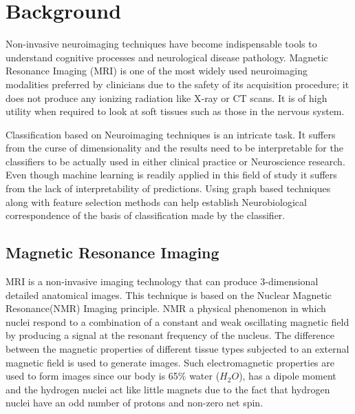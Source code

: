 \documentclass[msthesis.tex]{subfiles}
\begin{document}
\chapter{Background}
Non-invasive neuroimaging techniques have become indispensable tools to understand cognitive processes and neurological disease pathology. Magnetic Resonance Imaging (MRI)  is one of the most widely used neuroimaging modalities preferred by clinicians due to the safety of its acquisition procedure; it does not produce any ionizing radiation like X-ray or CT scans. It is of high utility when required to look at soft tissues such as those in the nervous system. 

Classification based on Neuroimaging techniques is an intricate task. It suffers from the curse of dimensionality and the results need to be interpretable for the classifiers to be actually used in either clinical practice or Neuroscience research. Even though machine learning is readily applied in this field of study it suffers from the lack of interpretability of predictions. Using graph based techniques along with feature selection methods can help establish Neurobiological correspondence of the basis of classification made by the classifier.  

\section{Magnetic Resonance Imaging}
MRI is a non-invasive imaging technology that can produce 3-dimensional detailed anatomical images\citep{mcrobbie_moore_graves_prince_2006}. This technique is based on the Nuclear Magnetic Resonance(NMR) Imaging principle. NMR a physical phenomenon in which nuclei respond to a combination of a constant and weak oscillating magnetic field by producing a signal at the resonant frequency of the nucleus. The difference between the magnetic properties of different tissue types subjected to an external magnetic field is used to generate images. Such electromagnetic properties are used to form images since our body is 65\% water ($H_2O$), has a dipole moment and the hydrogen nuclei act like little magnets due to the fact that hydrogen nuclei have an odd number of protons and non-zero net spin. 
\end{document}
